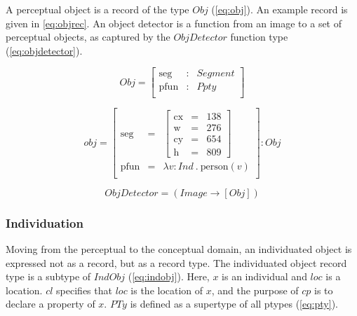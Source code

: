 A perceptual object is a record of the type $Obj$ (\autoref{eq:obj}).
An example record is given in \autoref{eq:objrec}.
An object detector is a function from an image to a set of perceptual objects, as captured by the $ObjDetector$ function type (\autoref{eq:objdetector}).

\begin{equation}\label{eq:obj}
Obj = \left[\begin{array}{rcl}
\text{seg} &:& Segment\\
\text{pfun} &:& Ppty \\
\end{array}\right]\end{equation}

\begin{equation}\label{eq:objrec}
obj =
\left[\begin{array}{rcl}
\text{seg} &=& \left[\begin{array}{rcl}
\text{cx} &=& 138\\
\text{w} &=& 276\\
\text{cy} &=& 654\\
\text{h} &=& 809
\end{array}\right]\\
\text{pfun} &=& \lambda v:Ind\ .\ \text{person}(v)\\
\end{array}\right] : Obj\end{equation}

\begin{equation}\label{eq:objdetector}
ObjDetector = ( Image \rightarrow [Obj] )
\end{equation}



\subsubsection{Individuation}

Moving from the perceptual to the conceptual domain, an individuated object is expressed not as a record, but as a record type.
The individuated object record type is a subtype of $IndObj$ (\autoref{eq:indobj}).
Here, $x$ is an individual and $loc$ is a location.
$cl$ specifies that $loc$ is the location of $x$, and the purpose of $cp$ is to declare a property of $x$.
$PTy$ is defined as a supertype of all ptypes (\autoref{eq:pty}).

